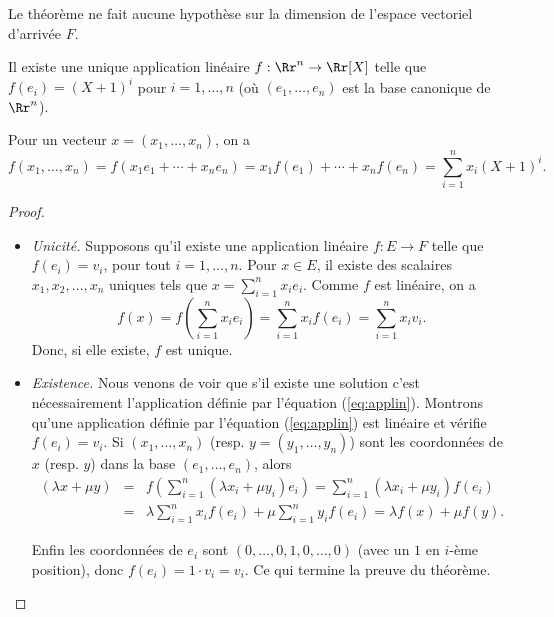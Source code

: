 \documentclass[class=report,crop=false]{standalone}
\begin{document}
Le théorème ne fait aucune  hypothèse sur la dimension de
l'espace vectoriel d'arrivée $F$.

\begin{exemple}
Il existe une unique application linéaire $f : \Rr^n \to \Rr[X]$
telle que $f(e_i) = (X+1)^i$ pour $i=1,\ldots,n$ (où $(e_1,\ldots,e_n)$ est
la base canonique de $\Rr^n$).

Pour un vecteur $x=(x_1,\ldots,x_n)$, on a
$$f(x_1,\ldots,x_n) = f(x_1e_1+\cdots +x_n e_n) = x_1f(e_1)+\cdots +x_nf(e_n) = \sum_{i=1}^n x_i(X+1)^i.$$
\end{exemple}



\begin{proof}
~
\begin{itemize}
  \item \emph{Unicité.} Supposons qu'il existe une application linéaire
  $f :E \to F$ telle que $f(e_i)=v_i$, pour tout $i=1,\ldots,n$.
  Pour $x \in E$, il existe des scalaires $x_1,x_2,\dots, x_n$ uniques tels que
$x=\sum_{i=1}^n x_ie_i$. Comme $f$ est
linéaire, on a
\begin{equation}
f(x)= f\left(\sum_{i=1}^n x_i e_i\right) = \sum_{i=1}^n x_i f(e_i)= \sum_{i=1}^n x_i v_i.
\label{eq:applin}
\tag{$*$}
\end{equation}
Donc, si elle existe, $f$ est unique.

  \item \emph{Existence.}
  Nous venons de voir que s'il existe une solution
  c'est nécessairement l'application définie par l'équation (\ref{eq:applin}).
  Montrons qu'une application définie par l'équation (\ref{eq:applin})
  est linéaire et vérifie $f(e_i)=v_i$.
  Si $(x_1,\ldots,x_n)$ (resp. $y = (y_1,\ldots, y_n)$) sont les coordonnées de $x$ (resp. $y$) dans la base
  $(e_1,\ldots,e_n)$, alors
  \begin{eqnarray*}
  (\lambda x + \mu y) &=& f\left(\sum_{i=1}^n (\lambda x_i+\mu y_i)e_i\right) 
  = \sum_{i=1}^n (\lambda x_i+\mu y_i)f(e_i) \\
  &=&  \lambda \sum_{i=1}^n x_i f(e_i) + \mu\sum_{i=1}^n  y_i f(e_i)
  = \lambda f(x) + \mu f(y).  
  \end{eqnarray*}


  Enfin les coordonnées de $e_i$ sont $(0,\ldots,0,1,0,\ldots,0)$ (avec un $1$ en $i$-ème position),
  donc $f(e_i) = 1 \cdot v_i = v_i$.
  Ce qui termine la preuve du théorème.
\end{itemize}
\end{proof}
\end{document}
